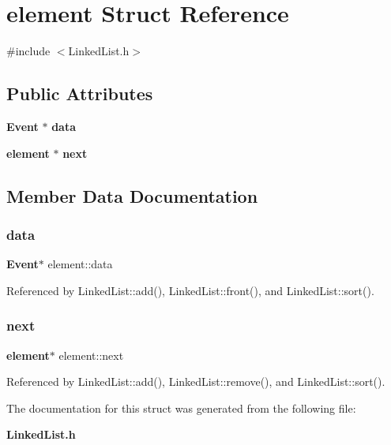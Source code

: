 \section{element Struct Reference}
\label{structelement}


{\ttfamily \#include $<$Linked\+List.\+h$>$}

\subsection*{Public Attributes}
\begin{DoxyCompactItemize}
\item 
\textbf{ Event} $\ast$ \textbf{ data}
\item 
\textbf{ element} $\ast$ \textbf{ next}
\end{DoxyCompactItemize}


\subsection{Member Data Documentation}
\mbox{\label{structelement_abb3842ab1f958407b55fd023ca6f5564}} 
\subsubsection{data}
{\footnotesize\ttfamily \textbf{ Event}$\ast$ element\+::data}



Referenced by Linked\+List\+::add(), Linked\+List\+::front(), and Linked\+List\+::sort().

\mbox{\label{structelement_af7a20c8d475534bedcf4f9a493c34f67}} 
\subsubsection{next}
{\footnotesize\ttfamily \textbf{ element}$\ast$ element\+::next}



Referenced by Linked\+List\+::add(), Linked\+List\+::remove(), and Linked\+List\+::sort().



The documentation for this struct was generated from the following file\+:\begin{DoxyCompactItemize}
\item 
\textbf{ Linked\+List.\+h}\end{DoxyCompactItemize}
